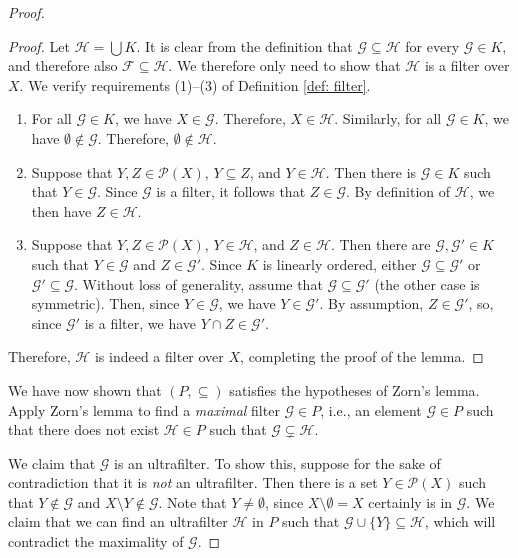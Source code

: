 \documentclass[a4paper]{memoir}
\theoremstyle{definition}
\newcommand{\mc}{\mathcal}
\newcommand{\power}{\ensuremath{\mathscr{P}}}
\begin{document}
\begin{proof}
  \begin{proof}
    Let $\mc{H} = \bigcup K$. It is clear from the definition that $\mc{G} \subseteq \mc{H}$ 
    for every $\mc{G} \in K$, and therefore also $\mc{F} \subseteq \mc{H}$. We therefore only 
    need to show that $\mc{H}$ is a filter over $X$. We verify requirements (1)--(3) of 
    Definition \ref{def: filter}.
    \begin{enumerate}
      \item For all $\mc{G} \in K$, we have $X \in \mc{G}$. Therefore, $X \in \mc{H}$. Similarly, 
      for all $\mc{G} \in K$, we have $\emptyset \notin \mc{G}$. Therefore, $\emptyset \notin 
      \mc{H}$.
      \item Suppose that $Y,Z \in \power(X)$, $Y \subseteq Z$, and $Y \in \mc{H}$. Then there is 
      $\mc{G} \in K$ such that $Y \in \mc{G}$. Since $\mc{G}$ is a filter, it follows that 
      $Z \in \mc{G}$. By definition of $\mc{H}$, we then have $Z \in \mc{H}$.
      \item Suppose that $Y,Z \in \power(X)$, $Y \in \mc{H}$, and $Z \in \mc{H}$. Then there are 
      $\mc{G}, \mc{G}' \in K$ such that $Y \in \mc{G}$ and $Z \in \mc{G}'$. Since $K$ is 
      linearly ordered, either $\mc{G} \subseteq \mc{G}'$ or $\mc{G}' \subseteq \mc{G}$. Without 
      loss of generality, assume that $\mc{G} \subseteq \mc{G}'$ (the other case is 
      symmetric). Then, since $Y \in \mc{G}$, we have $Y \in \mc{G}'$. By assumption, 
      $Z \in \mc{G}'$, so, since $\mc{G}'$ is a filter, we have $Y \cap Z \in \mc{G}'$.
    \end{enumerate}
    Therefore, $\mc{H}$ is indeed a filter over $X$, completing the proof of the lemma. 
  \end{proof}
  
  We have now shown that $(P, \subseteq)$ satisfies the hypotheses of Zorn's lemma. Apply 
  Zorn's lemma to find a \emph{maximal} filter $\mathcal{G} \in P$, i.e., an element 
  $\mathcal{G} \in P$ such that there does not exist $\mathcal{H} \in P$ such that 
  $\mathcal{G} \subsetneq \mathcal{H}$. 
  
  We claim that $\mathcal{G}$ is an ultrafilter. To show this, suppose for the sake of 
  contradiction that it is \emph{not} an ultrafilter. Then there is a set $Y \in \power(X)$ 
  such that $Y \notin \mathcal{G}$ and $X \setminus Y \notin \mathcal{G}$. Note that 
  $Y \neq \emptyset$, since $X \setminus \emptyset = X$ certainly is in $\mathcal{G}$. 
  We claim that we can find an ultrafilter $\mathcal{H}$ in $P$ such that 
  $\mathcal{G} \cup \{Y\} \subseteq \mathcal{H}$, which will contradict the maximality 
  of $\mathcal{G}$. 
  

\end{proof}
\end{document}
